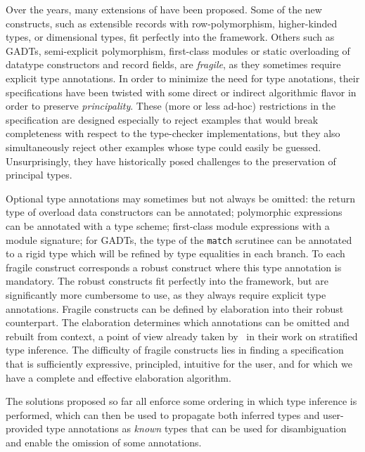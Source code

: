 \documentclass[acmsmall,screen,nonacm]{acmart}
\begin{document}
Over the years, many extensions of \ML have been proposed. Some of the new
constructs, such as extensible records with row-polymorphism, higher-kinded
types, or dimensional types, fit perfectly into the \ML framework. Others
such as GADTs, semi-explicit polymorphism, first-class modules or static
overloading of datatype constructors and record fields, are
\emph{fragile}, as they sometimes require explicit type
annotations.
In order to minimize the need for type anotations, their specifications have
been twisted with some direct or indirect algorithmic flavor in order to
preserve \emph{principality}.
%
These (more or less ad-hoc) restrictions in the specification are designed
especially to reject examples that would break completeness with respect to
the type-checker implementations, but they also simultaneously reject other
examples whose type could easily be guessed.  Unsurprisingly, they have historically posed
challenges to the preservation of principal types.

Optional type annotations may sometimes but not always be omitted: the
return type of overload data constructors can be annotated; polymorphic
expressions can be annotated with a type scheme; first-class module
expressions with a module signature; for GADTs, the type of the
\texttt{match} scrutinee can be annotated to a rigid type which will be
refined by type equalities in each branch. To each fragile construct
corresponds a robust construct where this type annotation is mandatory. The
robust constructs fit perfectly into the \ML framework, but are
significantly more cumbersome to use, as they always require explicit type
annotations.  Fragile constructs can be defined by elaboration into their
robust counterpart. The elaboration determines which annotations can be
omitted and rebuilt from context, a point of view already taken by~\citet
{Pottier-Regis-Gianas/stratified@popl06} in their work on stratified type
inference.
%
The difficulty of fragile constructs lies in finding a specification
that is sufficiently expressive, principled, intuitive for the user,
and for which we have a complete and effective elaboration algorithm.

The solutions proposed so far all enforce some ordering in which type
inference is performed, which can then be used to propagate both inferred
types and user-provided type annotations as \emph{known} types that can be
used for disambiguation and enable the omission of some annotations.
\end{document}
